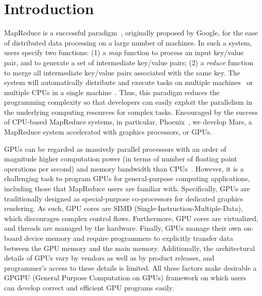 \chapter{Introduction}\label{sec-introduction}

MapReduce is a successful paradigm~\cite{Dean2008}, originally proposed by Google,
for the ease of distributed data processing on a large number of machines.
In such a system, users specify two functions:
(1) a {\em map} function to process an input key/value pair,
and to generate a set of intermediate key/value pairs;
(2) a {\em reduce} function to merge all intermediate key/value pairs associated with the same key.
The system will automatically distribute and execute tasks on multiple machines~\cite{HADOOP, Dean2008}
or multiple CPUs in a single machine~\cite{Ranger2007}.
Thus, this paradigm reduces the programming complexity so that developers can easily
exploit the parallelism in the underlying computing resources for complex tasks.
Encouraged by the success of CPU-based MapReduce systems, in particular, Phoenix~\cite{Ranger2007},
we develop Mars, a MapReduce system accelerated with graphics processors, or GPUs.

GPUs can be regarded as massively parallel processors with an order of magnitude higher computation
power (in terms of number of floating point operations per second) and memory bandwidth than CPUs~\cite{Ailamaki2006}.
However, it is a challenging task to program GPUs for general-purpose computing applications, including
those that MapReduce users are familiar with. Specifically, GPUs are traditionally designed as
special-purpose co-processors for dedicated graphics rendering. As such, GPU cores are SIMD
(Single-Instruction-Multiple-Data), which discourages complex control flows. Furthermore, GPU cores are virtualized, and threads are managed by the hardware. Finally,
GPUs manage their own on-board device memory and require programmers to explicitly
transfer data between the GPU memory and the main memory.  Additionally, the architectural details
of GPUs vary by vendors as well as by product releases, and programmer's access to these details is limited.
All these factors make desirable a GPGPU (General Purpose Computation on GPUs) framework
on which users can develop correct and efficient GPU programs easily.

